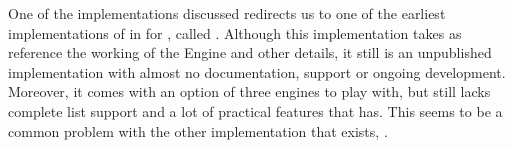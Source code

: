 \documentclass[thesis-solanki.tex]{subfiles}
\begin{document}
One of the implementations discussed redirects us to one of the earliest implementations of 
in  for , called
  \cite{website:mini-prolog-hugs98}.
Although this implementation takes as reference the working of the  Engine
and other details, it
still is an unpublished implementation
with almost no documentation, support  or ongoing development.
Moreover, it comes with an option of three engines to play
with, but still lacks complete list support
and a lot of
practical features that  has.
This seems to be a common problem with the other
implementation that exists, \cite{website:takashi-workplace}.
\end{document}
